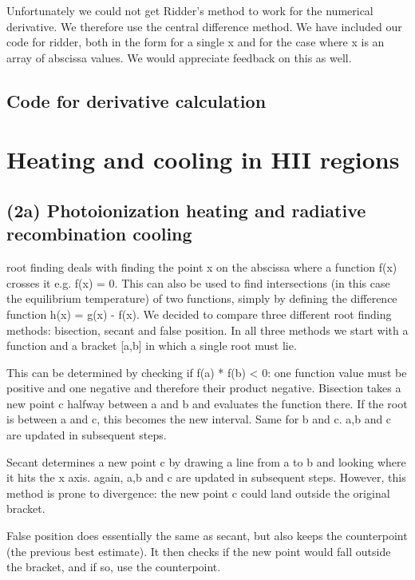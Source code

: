 \documentclass{article}
\newcommand{\CodeDir}{Code}
\begin{document}
Unfortunately we could not get Ridder's method to work for the numerical derivative.
We therefore use the central difference method.
We have included our code for ridder, both in the form for a single x and for the case where x is an array of abscissa values.
We would appreciate feedback on this as well.

\subsection{Code for derivative calculation}



\section{Heating and cooling in HII regions}


\subsection{(2a) Photoionization heating and radiative recombination cooling}
root finding deals with finding the point x on the abscissa where a function f(x) crosses it e.g. f(x) = 0.
This can also be used to find intersections (in this case the equilibrium temperature) of two functions, simply by defining the difference function h(x) = g(x) - f(x).
We decided to compare three different root finding methods: bisection, secant and false position.
In all three methods we start with a function and a bracket [a,b] in which a single root must lie.

This can be determined by checking if f(a) * f(b) < 0: one function value must be positive and one negative and therefore their product negative.
Bisection takes a new point c halfway between a and b and evaluates the function there. If the root is between a and c, this becomes the new interval. Same for b and c.
a,b and c are updated in subsequent steps.

Secant determines a new point c by drawing a line from a to b and looking where it hits the x axis.
again, a,b and c are updated in subsequent steps.
However, this method is prone to divergence: the new point c could land outside the original bracket.

False position does essentially the same as secant, but also keeps the counterpoint (the previous best estimate).
It then checks if the new point would fall outside the bracket, and if so, use the counterpoint.
\end{document}
